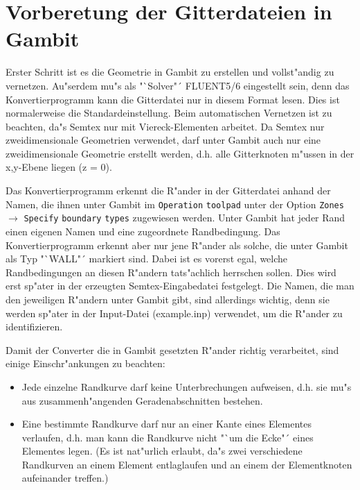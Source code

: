 \documentclass{article}
\begin{document}
\newpage
\section{Vorberetung der Gitterdateien in Gambit}

Erster Schritt ist es die Geometrie in Gambit zu erstellen und vollst"andig zu vernetzen. Au"serdem mu"s als "`Solver"´ FLUENT5/6 eingestellt sein, denn das Konvertierprogramm kann die Gitterdatei nur in diesem Format lesen. Dies ist normalerweise die Standardeinstellung. Beim automatischen Vernetzen ist zu beachten, da"s Semtex nur mit Viereck-Elementen arbeitet. Da Semtex nur zweidimensionale Geometrien verwendet, darf unter Gambit auch nur eine zweidimensionale Geometrie erstellt werden, d.h. alle Gitterknoten m"ussen in der x,y-Ebene liegen (z = 0).

Das Konvertierprogramm erkennt die R"ander in der Gitterdatei anhand der Namen, die ihnen unter Gambit im \verb|Operation| \verb|toolpad| unter der Option \verb|Zones| \(\to\) \verb|Specify| \verb|boundary| \verb|types| zugewiesen werden. Unter Gambit hat jeder Rand einen eigenen Namen und eine zugeordnete Randbedingung. Das Konvertierprogramm erkennt aber nur jene R"ander als solche, die unter Gambit als Typ "`WALL"´ markiert sind. Dabei ist es vorerst egal, welche Randbedingungen an diesen R"andern tats"achlich herrschen sollen. Dies wird erst sp"ater in der erzeugten Semtex-Eingabedatei festgelegt. Die Namen, die man den jeweiligen R"andern unter Gambit gibt, sind allerdings wichtig, denn sie werden sp"ater in der Input-Datei (example.inp) verwendet, um die R"ander zu identifizieren.

Damit der Converter die in Gambit gesetzten R"ander richtig verarbeitet, sind einige Einschr"ankungen zu beachten:

\begin{itemize}

\item Jede einzelne Randkurve darf keine Unterbrechungen aufweisen, d.h. sie mu"s aus zusammenh"angenden Geradenabschnitten bestehen.

\item Eine bestimmte Randkurve darf nur an einer Kante eines Elementes verlaufen, d.h. man kann die Randkurve nicht "`um die Ecke"´ eines Elementes legen. (Es ist nat"urlich erlaubt, da"s zwei verschiedene Randkurven an einem Element entlaglaufen und an einem der Elementknoten aufeinander treffen.)

\end{itemize}
\end{document}
